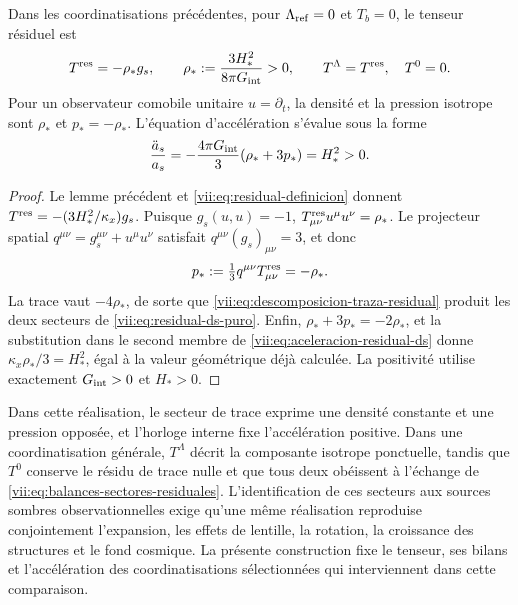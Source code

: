 \begin{theorem}
\label{vii:thm:residual-ds-aceleracion}
Dans les coordinatisations précédentes, pour \(\Lambda_{\rm ref}=0\) et \(T_b=0\), le tenseur résiduel est
\begin{equation}
 T^{\rm res}=-\rho_*g_s,\qquad
 \rho_*:=\frac{3H_*^2}{8\pi G_{\rm int}}>0,
 \qquad T^\Lambda=T^{\rm res},\quad T^0=0.
 \label{vii:eq:residual-ds-puro}
\end{equation}
Pour un observateur comobile unitaire \(u=\partial_t\), la densité
et la pression isotrope sont \(\rho_*\) et \(p_*=-\rho_*\).
L'équation d'accélération s'évalue sous la forme
\begin{equation}
 \frac{\ddot a_s}{a_s}
 =-\frac{4\pi G_{\rm int}}3(\rho_*+3p_*)=H_*^2>0.
 \label{vii:eq:aceleracion-residual-ds}
\end{equation}
\end{theorem}
\begin{proof}
Le lemme précédent et \eqref{vii:eq:residual-definicion} donnent \(T^{\rm res}=-(3H_*^2/\kappa_x)g_s\). Puisque \(g_s(u,u)=-1\), \(T^{\rm res}_{\mu\nu}u^\mu u^\nu=\rho_*\). Le projecteur spatial \(q^{\mu\nu}=g_s^{\mu\nu}+u^\mu u^\nu\) satisfait \(q^{\mu\nu}(g_s)_{\mu\nu}=3\), et donc
\[
 p_*:=\tfrac13q^{\mu\nu}T^{\rm res}_{\mu\nu}=-\rho_*.
\]
La trace vaut \(-4\rho_*\), de sorte que
\eqref{vii:eq:descomposicion-traza-residual} produit les deux secteurs
de \eqref{vii:eq:residual-ds-puro}. Enfin,
\(\rho_*+3p_*=-2\rho_*\), et la substitution dans le second membre
de \eqref{vii:eq:aceleracion-residual-ds} donne
\(\kappa_x\rho_*/3=H_*^2\), égal à la valeur géométrique déjà calculée.
La positivité utilise exactement \(G_{\rm int}>0\) et \(H_*>0\).
\end{proof}

Dans cette réalisation, le secteur de trace exprime une densité constante et une pression opposée, et l'horloge interne fixe l'accélération positive. Dans une coordinatisation générale, \(T^\Lambda\) décrit la composante isotrope ponctuelle, tandis que \(T^0\) conserve le résidu de trace nulle et que tous deux obéissent à l'échange de \eqref{vii:eq:balances-sectores-residuales}. L'identification de ces secteurs aux sources sombres observationnelles exige qu'une même réalisation reproduise conjointement l'expansion, les effets de lentille, la rotation, la croissance des structures et le fond cosmique. La présente construction fixe le tenseur, ses bilans et l'accélération des coordinatisations sélectionnées qui interviennent dans cette comparaison.
